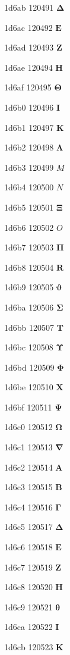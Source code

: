 \documentclass[11pt]{article}
\begin{document}
1d6ab 120491 \ensuremath{\mathbf{\Delta}}

1d6ac 120492 \ensuremath{\mathbf{{E}}}

1d6ad 120493 \ensuremath{\mathbf{{Z}}}

1d6ae 120494 \ensuremath{\mathbf{{H}}}

1d6af 120495 \ensuremath{\mathbf{\Theta}}

1d6b0 120496 \ensuremath{\mathbf{{I}}}

1d6b1 120497 \ensuremath{\mathbf{{K}}}

1d6b2 120498 \ensuremath{\mathbf{\Lambda}}

1d6b3 120499 \ensuremath{M}

1d6b4 120500 \ensuremath{N}

1d6b5 120501 \ensuremath{\mathbf{\Xi}}

1d6b6 120502 \ensuremath{O}

1d6b7 120503 \ensuremath{\mathbf{\Pi}}

1d6b8 120504 \ensuremath{\mathbf{{R}}}

1d6b9 120505 \ensuremath{\mathbf{\vartheta}}

1d6ba 120506 \ensuremath{\mathbf{\Sigma}}

1d6bb 120507 \ensuremath{\mathbf{{T}}}

1d6bc 120508 \ensuremath{\mathbf{\Upsilon}}

1d6bd 120509 \ensuremath{\mathbf{\Phi}}

1d6be 120510 \ensuremath{\mathbf{{X}}}

1d6bf 120511 \ensuremath{\mathbf{\Psi}}

1d6c0 120512 \ensuremath{\mathbf{\Omega}}

1d6c1 120513 \ensuremath{\mathbf{\nabla}}

1d6c2 120514 \ensuremath{\mathbf{{A}}}

1d6c3 120515 \ensuremath{\mathbf{{B}}}

1d6c4 120516 \ensuremath{\mathbf{\Gamma}}

1d6c5 120517 \ensuremath{\mathbf{\Delta}}

1d6c6 120518 \ensuremath{\mathbf{{E}}}

1d6c7 120519 \ensuremath{\mathbf{{Z}}}

1d6c8 120520 \ensuremath{\mathbf{{H}}}

1d6c9 120521 \ensuremath{\mathbf{\theta}}

1d6ca 120522 \ensuremath{\mathbf{{I}}}

1d6cb 120523 \ensuremath{\mathbf{{K}}}
\end{document}
